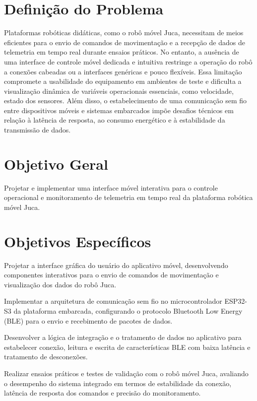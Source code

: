 \section{Definição do Problema}

Plataformas robóticas didáticas, como o robô móvel Juca, necessitam de meios eficientes para o envio de comandos de movimentação e a recepção de dados de telemetria em tempo real durante ensaios práticos. No entanto, a ausência de uma interface de controle móvel dedicada e intuitiva restringe a operação do robô a conexões cabeadas ou a interfaces genéricas e pouco flexíveis. Essa limitação compromete a usabilidade do equipamento em ambientes de teste e dificulta a visualização dinâmica de variáveis operacionais essenciais, como velocidade, estado dos sensores.
Além disso, o estabelecimento de uma comunicação sem fio entre dispositivos móveis e sistemas embarcados impõe desafios técnicos em relação à latência de resposta, ao consumo energético e à estabilidade da transmissão de dados. 

\section{Objetivo Geral}

Projetar e implementar uma interface móvel interativa para o controle operacional e monitoramento de telemetria em tempo real da plataforma robótica móvel Juca.

\section{Objetivos Específicos}

\begin{alineas}
    \item Projetar a interface gráfica do usuário do aplicativo móvel, desenvolvendo componentes interativos para o envio de comandos de movimentação e visualização dos dados do robô Juca.
    \item Implementar a arquitetura de comunicação sem fio no microcontrolador ESP32-S3 da plataforma embarcada, configurando o protocolo Bluetooth Low Energy (BLE) para o envio e recebimento de pacotes de dados. 
    \item Desenvolver a lógica de integração e o tratamento de dados no aplicativo para estabelecer  conexão, leitura e escrita de características BLE com baixa latência e tratamento de desconexões.
    \item Realizar ensaios práticos e testes de validação com o robô móvel Juca, avaliando o desempenho do sistema integrado em termos de estabilidade da conexão, latência de resposta dos comandos e precisão do monitoramento.
\end{alineas}
    
